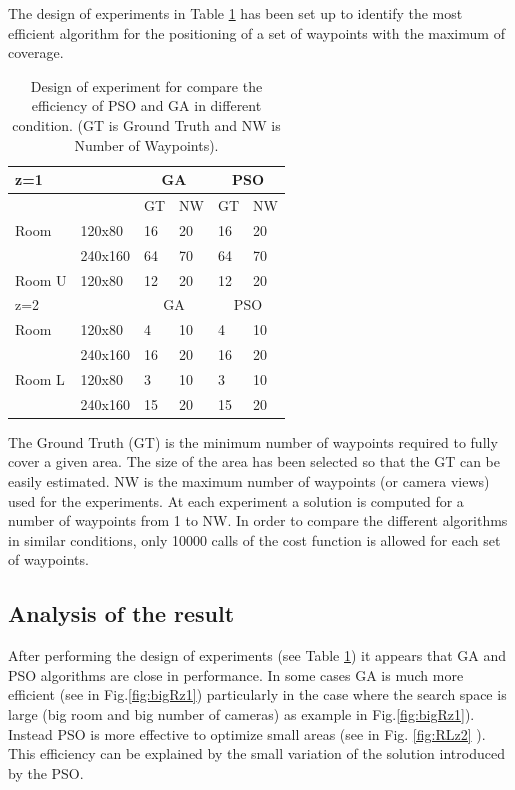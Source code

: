 The design of experiments in Table \ref{table:table1} has been set up to identify the most efficient algorithm for the positioning of a set of waypoints with the maximum of coverage. 


\begin{table}[!htb]
\begin{tabular}{|l|l|l|l|l|l|}
  \hline
  \multicolumn{2}{|l|}{z=1 } &\multicolumn{2}{|c|}{GA}  & \multicolumn{2}{|c|}{PSO} \\  \hline
  \multicolumn{2}{|c|}{ } & GT & NW & GT & NW\\ \hline
  Room &  120x80 & 16 &20 & 16 & 20\\ \cline{2-6}
     &  240x160 & 64 &70 & 64 & 70 \\ \hline
  Room U &  120x80 & 12 &20 & 12 & 20\\ \hline
  \multicolumn{2}{|l|}{z=2 } &\multicolumn{2}{|c|}{GA}  & \multicolumn{2}{|c|}{PSO} \\  \hline
 Room &  120x80 & 4 &10 & 4 & 10\\ \cline{2-6}
     &  240x160 & 16 &20 & 16 & 20 \\ \hline
 Room L&  120x80 & 3 &10 & 3 & 10\\ \cline{2-6}
     &  240x160 & 15 &20 & 15 & 20 \\ \hline
\end{tabular}
\caption{Design of experiment for compare the efficiency of PSO and GA in different condition.  (GT is Ground Truth and NW is Number of Waypoints).}\label{table:table1}
\end{table}
The Ground Truth (GT) is the minimum number of waypoints required to fully cover a given area. The size of the area has been selected so that the GT can be easily estimated. NW is the maximum number of waypoints (or camera views) used for the experiments. At each experiment a solution is computed for a number of waypoints from 1 to NW. In order to compare the different algorithms in similar conditions, only 10000 calls of the cost function is allowed for each set of waypoints.

\subsection{ Analysis of the result}
After performing the design of experiments (see Table \ref{table:table1}) it appears that GA and PSO algorithms are close in performance. In some cases GA is much more efficient (see in Fig.\ref{fig:bigRz1}) particularly in the case where the search space is large (big room and big number of cameras)  as example in Fig.\ref{fig:bigRz1}). Instead PSO is more effective to optimize small areas (see in Fig. \ref{fig:RLz2} ).
This efficiency can be explained by the small variation of the solution introduced by the PSO. 

